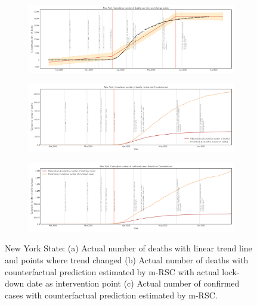 \documentclass[preprint,authoryear,12pt]{elsarticle}
\begin{document}
		\begin{figure}
			\centering
			\begin{subfigure}[b]{\textwidth}
				\centering
				\includegraphics[width=0.9\linewidth,height=0.2\textheight]{New York_deaths_trend}
			\end{subfigure}
			
			\begin{subfigure}[b]{\textwidth}
				\centering
				\includegraphics[width=0.9\linewidth,height=0.2\textheight]{New York_deaths}
			\end{subfigure}

			\begin{subfigure}[b]{\textwidth}
				\centering
				\includegraphics[width=0.9\linewidth,height=0.2\textheight]{New York_confirmed cases}
			\end{subfigure}

			\caption[New York]{New York State: (a) Actual number of deaths with linear trend line and points where trend changed (b) Actual number of deaths with counterfactual prediction estimated by m-RSC with actual lock-down date as intervention point (c) Actual number of confirmed cases with counterfactual prediction estimated by m-RSC.}
			\label{fig5} 
		\end{figure}
	
\end{document}
